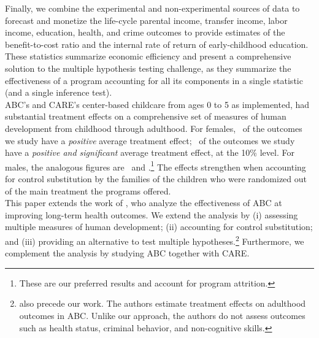 \noindent Finally, we combine the experimental and non-experimental sources of data to forecast and monetize the life-cycle parental income, transfer income, labor income, education, health, and crime outcomes to provide estimates of the benefit-to-cost ratio and the internal rate of return of early-childhood education. These statistics summarize economic efficiency and present a comprehensive solution to the multiple hypothesis testing challenge, as they summarize the effectiveness of a program accounting for all its components in a single statistic (and a single inference test).\\

\noindent ABC's and CARE's center-based childcare from ages 0 to 5 as implemented, had substantial treatment effects on a comprehensive set of measures of human development from childhood through adulthood. For females, \positivef\ of the outcomes we study have a \textit{positive} average treatment effect; \positivesf\ of the outcomes we study have a \textit{positive and significant} average treatment effect, at the 10\% level. For males, the analogous figures are \positivem\ and \positivesm.\footnote{These are our preferred results and account for program attrition.} The effects strengthen when accounting for control substitution by the families of the children who were randomized out of the main treatment  the programs offered.\\

\noindent This paper extends the work of \citet{Campbell_Conti_etal_2014_EarlyChildhoodInvestments}, who analyze the effectiveness of ABC at improving long-term health outcomes. We extend the analysis by (i) assessing multiple measures of human development; (ii) accounting for control substitution; and (iii) providing an alternative to test multiple hypotheses.\footnote{\cite{Campbell_Pungello_etal_2012_DP} also precede our work. The authors estimate treatment effects on adulthood outcomes in ABC. Unlike our approach, the authors do not assess outcomes such as health status, criminal behavior, and non-cognitive skills.} Furthermore, we complement the analysis by studying ABC together with CARE.\\ 

